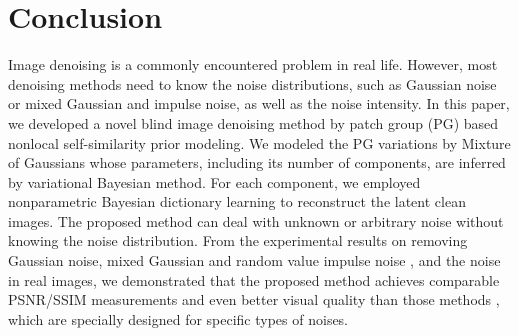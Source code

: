 \documentclass[runningheads]{llncs}
\begin{document}
\section{Conclusion}
Image denoising is a commonly encountered problem in real life. However, most denoising methods \cite{bpfa,bm3d,lssc,epll,wnnm,pgpd,cai2010fast,wesnr} need to know the noise distributions, such as Gaussian noise or mixed Gaussian and impulse noise, as well as the noise intensity. In this paper, we developed a novel blind image denoising method by patch group (PG) based nonlocal self-similarity prior modeling. We modeled the PG variations by Mixture of Gaussians \cite{prml} whose parameters, including its number of components, are inferred by variational Bayesian method. For each component, we employed nonparametric Bayesian dictionary learning \cite{bpfa,thibaux2007,paisley2009} to reconstruct the latent clean images. The proposed method can deal with unknown or arbitrary noise without knowing the noise distribution. From the experimental results on removing Gaussian noise, mixed Gaussian and random value impulse noise , and the noise in real images, we demonstrated that the proposed method achieves comparable PSNR/SSIM measurements and even better visual quality than those methods \cite{bpfa,bm3d,wnnm,pgpd,cai2010fast,wesnr,noiseclinic,neatimage}, which are specially designed for specific types of noises.





\end{document}

